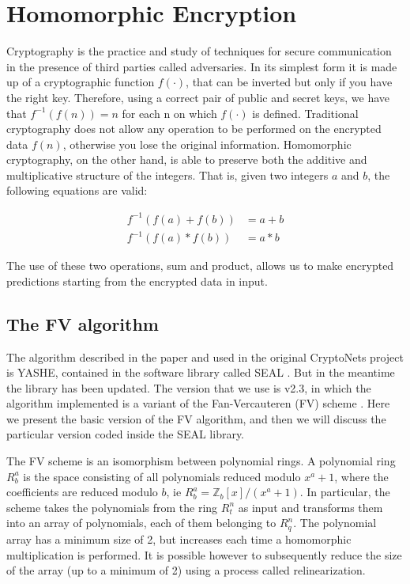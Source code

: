 \section{Homomorphic Encryption}

Cryptography is the practice and study of techniques for secure communication in the presence of third parties called adversaries. In its simplest form it is made up of a cryptographic function $f(\cdot)$, that can be inverted but only if you have the right key. Therefore, using a correct pair of public and secret keys, we have that $f^{-1}(f(n))=n$ for each n on which $f(\cdot)$ is defined. Traditional cryptography does not allow any operation to be performed on the encrypted data $f(n)$, otherwise you lose the original information. Homomorphic cryptography, on the other hand, is able to preserve both the additive and multiplicative structure of the integers. That is, given two integers $a$ and $b$, the following equations are valid:

\begin{align*}
  f^{-1}(f(a)+f(b)) &= a+b\\
  f^{-1}(f(a)*f(b)) &= a*b
\end{align*}

The use of these two operations, sum and product, allows us to make encrypted predictions starting from the encrypted data in input.

\subsection{The FV algorithm}

The algorithm described in the paper and used in the original CryptoNets project is YASHE, contained in the software library called SEAL \cite{dowlin2016cryptonets}. But in the meantime the library has been updated. The version that we use is v2.3, in which the algorithm implemented is a variant of the Fan-Vercauteren (FV) scheme \cite{seal-manual}. Here we present the basic version of the FV algorithm, and then we will discuss the particular version coded inside the SEAL library.

The FV scheme is an isomorphism between polynomial rings. A polynomial ring $R^a_b$ is the space consisting of all polynomials reduced modulo $x^a+1$, where the coefficients are reduced modulo $b$, ie $R^a_b = \mathbb{Z}_b[x]/(x^a+1)$. In particular, the scheme takes the polynomials from the ring $R^n_t$ as input and transforms them into an array of polynomials, each of them belonging to $R^n_q$. The polynomial array has a minimum size of 2, but increases each time a homomorphic multiplication is performed. It is possible however to subsequently reduce the size of the array (up to a minimum of 2) using a process called relinearization.

